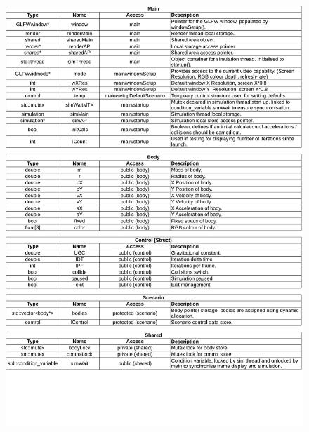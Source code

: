 \begin{figure}[H]
   \centering
   \includegraphics[page=2, width=\textwidth]{../varlist.pdf} 
\end{figure}

